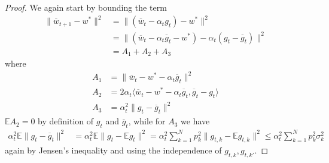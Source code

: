 \begin{proof}
	We again start by bounding the term
	\begin{align*}
	\|\overline{w}_{t+1}-w^{\ast}\|^{2} & =\|(\overline{w}_{t}-\alpha_{t}g_{t})-w^{\ast}\|^{2}\\
	& =\|(\overline{w}_{t}-\alpha_{t}\overline{g}_{t}-w^{\ast})-\alpha_{t}(g_{t}-\overline{g}_{t})\|^{2}\\
	& =A_{1}+A_{2}+A_{3}
	\end{align*}
	where 
	\begin{align*}
	A_{1} & =\|\overline{w}_{t}-w^{\ast}-\alpha_{t}\overline{g}_{t}\|^{2}\\
	A_{2} & =2\alpha_{t}\langle\overline{w}_{t}-w^{\ast}-\alpha_{t}\overline{g}_{t},\overline{g}_{t}-g_{t}\rangle\\
	A_{3} & =\alpha_{t}^{2}\|g_{t}-\overline{g}_{t}\|^{2}
	\end{align*}
	$\mathbb{E}A_{2}=0$ by definition of $g_{t}$ and $\overline{g}_{t}$,
	while for $A_{3}$ we have
	\begin{align*}
	\alpha_{t}^{2}\mathbb{E}\|g_{t}-\overline{g}_{t}\|^{2} & =\alpha_{t}^{2}\mathbb{E}\|g_{t}-\mathbb{E}g_{t}\|^{2}=\alpha_{t}^{2}\sum_{k=1}^{N}p_{k}^{2}\|g_{t,k}-\mathbb{E}g_{t,k}\|^{2}\leq\alpha_{t}^{2}\sum_{k=1}^{N}p_{k}^{2}\sigma_{k}^{2}
	\end{align*}
	again by Jensen's inequality and using the independence of $g_{t,k},g_{t,k'}$. 
	

\end{proof}
